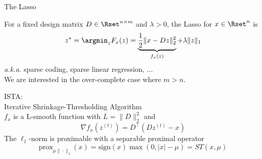 \documentclass{beamer}
\begin{document}
\begin{frame}{The Lasso}

    For a fixed design matrix $D \in \Rset^{n\times m}$ and $\lambda > 0$, the Lasso for $x\in \Rset^n$ is \\[.5em]
    \[
    z^{*} = \argmin_{z} F_x(z) =
    \underbrace{\frac{1}{2}\| x - D z\|_2^2}_{f_x(z)}
    + \lambda\| z\|_1
    \]
    \emph{a.k.a.} sparse coding, sparse linear regression, ...\\[1em]
    We are interested in the over-complete case where $m > n$.\\[2em]
\end{frame}

\begin{frame}{ISTA: \\
              Iterative Shrinkage-Thresholding Algorithm\\}
    $f_x$ is a L-smooth function with $L = \|D\|_2^2$ and
    \[
        \nabla f_x(z^{(t)}) = D^\top(D z^{(t)} - x)
    \]
    The $\ell_1$-norm is proximable with a separable proximal operator
    \[
        \text{prox}_{\mu\|\cdot\|_1}(x) = \text{sign}(x)\max(0, |x| - \mu)
                                        = ST(x, \mu)
    \]
    \uncover<2>{
    We can use the proximal gradient descent algorithm (ISTA)
    \[
        z^{(t+1)} = \text{ST}\left(z^{(t)}
                                   - \rho\underbrace{\nabla f_x(z^{(t)})}_{D^\top(D z^{(t)} - x)},
                                   \rho\lambda\right)
    \]
    Here, $\rho$ play the role of a step size (in $[0, \frac{2}{L}[$).
    }
\end{frame}
\end{document}
